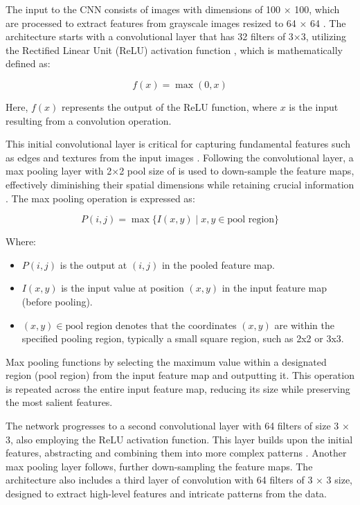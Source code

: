 \documentclass[journal,article,submit,pdftex,moreauthors]{Definitions/mdpi}
\begin{document}
The input to the CNN consists of images with dimensions of 100 × 100, which are processed to extract features from grayscale images resized to 64 × 64 \cite{he2016deep}. The architecture starts with a convolutional layer that has 32 filters of 3×3, utilizing the Rectified Linear Unit (ReLU) activation function \cite{nair2010rectified}, which is mathematically defined as:

\begin{equation}
    f(x) = \max(0, x)
\end{equation}

Here, \(f(x)\) represents the output of the ReLU function, where \(x\) is the input resulting from a convolution operation.

This initial convolutional layer is critical for capturing fundamental features such as edges and textures from the input images \cite{szegedy2015going}. Following the convolutional layer, a max pooling layer with 2×2 pool size of  is used to down-sample the feature maps, effectively diminishing their spatial dimensions while retaining crucial information \cite{scherer2010evaluation}. The max pooling operation is expressed as:

\begin{equation}
    P(i, j) = \max\{I(x, y) \mid x, y \in \text{pool region}\}
\end{equation}

Where:

\begin{itemize}
  \item \(P(i, j)\) is the output at \((i, j)\) in the pooled feature map.
  \item \(I(x, y)\) is the input value at position \((x, y)\) in the input feature map (before pooling).
  \item \((x, y) \in \text{pool region}\) denotes that the coordinates \((x, y)\) are within the specified pooling region, typically a small square region, such as 2x2 or 3x3.
\end{itemize}

Max pooling functions by selecting the maximum value within a designated region (pool region) from the input feature map and outputting it. This operation is repeated across the entire input feature map, reducing its size while preserving the most salient features.

The network progresses to a second convolutional layer with 64 filters of size 3 × 3, also employing the ReLU activation function. This layer builds upon the initial features, abstracting and combining them into more complex patterns \cite{lecun1998gradient}. Another max pooling layer follows, further down-sampling the feature maps. The architecture also includes a third layer of convolution with 64 filters of 3 × 3 size, designed to extract high-level features and intricate patterns from the data.
\end{document}
